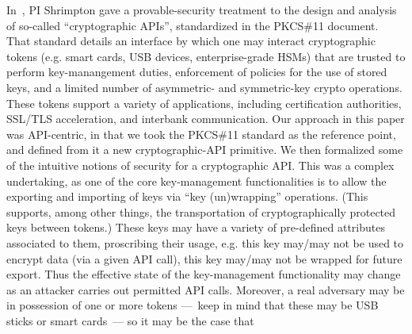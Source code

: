 In~\cite{SSW}, PI Shrimpton gave a provable-security treatment to the design and analysis of so-called ``cryptographic APIs'', standardized in the PKCS\#11 document\cite{}.  That standard details an interface by which one may interact cryptographic tokens (e.g. smart cards, USB devices, enterprise-grade HSMs) that are trusted to perform key-manangement duties, enforcement of policies for the use of stored keys, and a limited number of asymmetric- and symmetric-key crypto operations.  These tokens support a variety of applications, including certification authorities, SSL/TLS acceleration, and interbank communication.  Our approach in this paper was API-centric, in that we took the PKCS\#11 standard as the reference point, and defined from it a new cryptographic-API primitive.  We then formalized some of the intuitive notions of security for a cryptographic API.  This was a complex undertaking, as one of the core key-management functionalities is to allow the exporting and importing of keys via ``key (un)wrapping'' operations.  (This supports, among other things, the transportation of cryptographically protected keys between tokens.)  These keys may have a variety of pre-defined attributes associated to them, proscribing their usage, e.g. this key may/may not be used to encrypt data (via a given API call), this key may/may not be wrapped for future export.  Thus the effective state of the key-management functionality may change as an attacker carries out permitted API calls.  Moreover, a real adversary may be in possession of one or more tokens ---~keep in mind that these may be USB sticks or smart cards~--- so it may be the case that  

